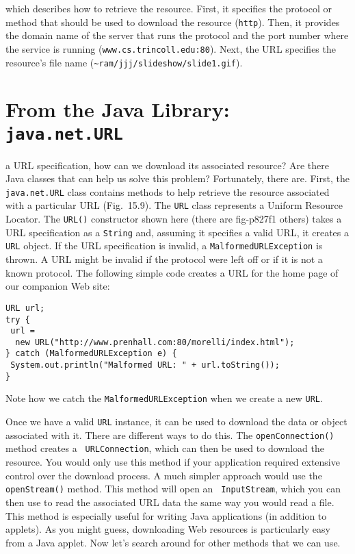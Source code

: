 \noindent which describes how to retrieve the resource.   First, it
specifies the protocol or method that should be used to download the
resource ({\tt http}). Then, it provides the domain name of the server
that runs the protocol and the port number where the service is
running ({\tt www.cs.trincoll.edu:80}).  Next, the URL specifies the
resource's file name ({\tt \verb|~|ram/jjj/slideshow/slide1.gif}).

\section{From the Java Library: {\tt java.net.URL}}
\label{fromthe-java-library}



 a URL specification, how can we download its associated
resource?  Are there Java classes that can help us solve this problem?
Fortunately, there are.  First, the {\tt java.net.URL} class contains
methods to help retrieve the resource associated with a particular URL
(Fig.~15.9).  The {\tt URL} class represents a Uniform
Resource Locator.  The {\tt URL()} constructor shown here (there are
{fig-p827f1}
others) takes a URL specification as a {\tt String} and, assuming it
specifies a valid URL, it creates a {\tt URL} object.  If the URL
\WWWjava
specification is invalid, a {\tt MalformedURLException} is thrown.  A
URL might be invalid if the protocol were left off or if it is not a
known protocol.  The following simple code creates a URL for the home
page of our companion Web site:

\begin{jjjlisting}
\begin{lstlisting}
URL url;
try {
 url = 
  new URL("http://www.prenhall.com:80/morelli/index.html");
} catch (MalformedURLException e) {
 System.out.println("Malformed URL: " + url.toString());
}
\end{lstlisting}
\end{jjjlisting}

\noindent Note how we catch the {\tt MalformedURLException}
when we create a new {\tt URL}.

Once we have a valid {\tt URL} instance, it can be used to download
the data or object associated with it.  There are different ways to do
this.  The {\tt openConnection()} method creates a {\tt
URLConnection}, which can then be used to download the resource.  You
would only use this method if your application required extensive
control over the download process.  A much simpler approach would use
the {\tt openStream()} method.  This method will open an {\tt
InputStream}, which you can then use to read the associated URL data
the same way you would read a file.  This method is especially useful
for writing Java applications (in addition to applets).  As you might
guess, downloading Web resources is particularly easy from a Java
applet.  Now let's search around for other methods that we can use.

